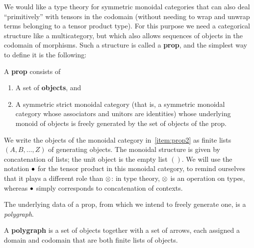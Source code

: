 \begin{props}

We would like a type theory for symmetric monoidal categories that can also deal ``primitively'' with tensors in the codomain (without needing to wrap and unwrap terms belonging to a tensor product type).
For this purpose we need a categorical structure like a multicategory, but which also allows sequences of objects in the codomain of morphisms.
Such a structure is called a \textbf{prop}, and the simplest way to define it is the following:

\begin{defn}\label{defn:prop}
  A \textbf{prop} consists of
  \begin{enumerate}
  \item A set of \textbf{objects}, and
  \item A symmetric strict monoidal category (that is, a symmetric monoidal category whose associators and unitors are identities) whose underlying monoid of objects is freely generated by the set of objects of the prop.\label{item:prop2}
  \end{enumerate}
\end{defn}

We write the objects of the monoidal category in~\ref{item:prop2} as finite lists $(A,B,\dots,Z)$ of generating objects.
The monoidal structure is given by concatenation of lists; the unit object is the empty list $()$.
We will use the notation $\bullet$ for the tensor product in this monoidal category, to remind ourselves that it plays a different role than $\otimes$: in type theory, $\otimes$ is an operation on types, whereas $\bullet$ simply corresponds to concatenation of contexts.

The underlying data of a prop, from which we intend to freely generate one, is a \emph{polygraph}.

\begin{defn}
  A \textbf{polygraph} \cG is a set of objects together with a set of arrows, each assigned a domain and codomain that are both finite lists of objects.
\end{defn}


\end{props}
